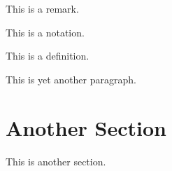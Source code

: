 \documentclass{zett}
\begin{document}
\begin{remark}
  This is a remark.
\end{remark}

\begin{notation}
  This is a notation.
\end{notation}

\begin{definition}
  This is a definition.
\end{definition}

\para%
This is yet another paragraph.

\section{Another Section}
\label{sec:another-section}

\para%
This is another section.



\end{document}
